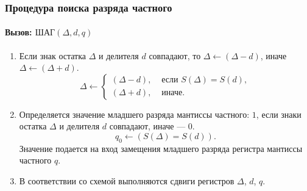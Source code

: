 \begin{frame}
    \frametitle{Процедура поиска разряда частного}
    \framesubtitle{Вызов: $\text{ШАГ}(\Delta,d,q)$}

    \begin{enumerate}
        \item Если знак остатка $\Delta$ и делителя $d$ совпадают, то $\Delta\gets(\Delta-d)$, иначе $\Delta\gets(\Delta+d)$.
        \[
            \Delta\gets
                \begin{cases}
                    (\Delta-d), & \text{ если $S(\Delta)=S(d)$},\\
                    (\Delta+d), & \text{ иначе}.
                \end{cases}
        \]
        
        \item Определяется значение младшего разряда мантиссы частного: $1$, если знаки остатка $\Delta$ и делителя $d$ совпадают, иначе --- $0$.
        \[
            q_0\gets(S(\Delta)=S(d)).
        \]
        Значение подается на вход замещения младшего разряда регистра мантиссы частного $q$.
        
        \item В соответствии со схемой выполняются сдвиги регистров $\Delta$, $d$, $q$.
    \end{enumerate}
\end{frame}


